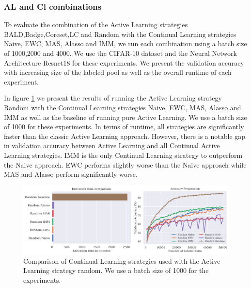 \subsubsection{AL and Cl combinations}
\label{sec:Evaluation:Results:CAL:ALCL}
To evaluate the combination of the Active Learning strategies BALD,Badge,Coreset,LC and Random with the Continual Learning strategies Naive, EWC, MAS, Alasso and IMM, we run each combination
using a batch size of 1000,2000 and 4000. We use the CIFAR-10 dataset and the Neural Network Architecture Resnet18 for these experiments. We present the validation accuracy with increasing
size of the labeled pool as well as the overall runtime of each experiment. \par
In figure \ref{fig:Evaluation:Results:CAL:Random1000} we present the results of running the Active Learning strategy Random with the Continual Learning strategies Naive, EWC, MAS, Alasso and IMM
as well as the baseline of running pure Active Learning. We use a batch size of 1000 for these experiments. In terms of runtime, all strategies are significantly faster than the classic Active
 Learning approach. However, there is a notable gap in validation accuracy between Active Learning and all Continual
Active Learning strategies. IMM is the only Continual Learning strategy to outperform the Naive approach. EWC performs slightly worse than the Naive approach while MAS and Alasso
perform significantly worse.

\begin{figure}[ht]
    \centering
    \includegraphics[width=\linewidth]{images/results_CAL/Random_CAL_1000b.png}
    \caption[Continual Active Learning Random 1000 batch size]{Comparison of Continual Learning strategies used with the Active Learning strategy random. We use a batch size of 1000 for the experiments.
    }
    \label{fig:Evaluation:Results:CAL:Random1000}
\end{figure}

